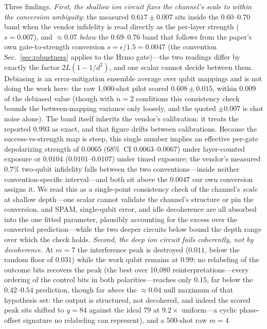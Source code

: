 \documentclass[aps,pra,reprint,superscriptaddress,nofootinbib,floatfix]{revtex4-2}
\begin{document}
Three findings. \emph{First, the shallow ion circuit fixes the
channel's scale to within the conversion ambiguity}: the measured
$0.617\pm0.007$ sits inside the $0.60$--$0.70$ band when the vendor
infidelity is read directly as the per-layer strength ($s=0.007$),
and ${\approx}0.07$ \emph{below} the $0.69$--$0.76$ band that follows
from the paper's own gate-to-strength conversion
$s=\epsilon/1.5=0.0047$ (the convention Sec.~\ref{sec:robustness}
applies to the Hrmo gate)---the two readings differ by exactly the
factor $2L(1-1/d^2)$, and one scalar cannot decide between them.
Debiasing is
an error-mitigation ensemble average over qubit mappings and is not
doing the work here: the raw 1{,}000-shot pilot scored
$0.608\pm0.015$, within $0.009$ of the debiased value (though with
$n=2$ conditions this consistency check bounds the between-mapping
variance only loosely, and the quoted $\pm0.007$ is shot noise
alone). The band itself inherits the vendor's calibration: it treats
the reported $0.993$ as exact, and that figure drifts between
calibrations.
Because the
success-vs-strength map is steep, this single number implies an
effective per-gate depolarizing strength of $0.0065$
($68\%$~CI $0.0063$--$0.0067$) under layer-counted exposure or
$0.0104$ ($0.0101$--$0.0107$) under timed exposure; the vendor's
measured $0.7\%$ two-qubit infidelity falls between the two
conventions---inside neither convention-specific interval---and both
sit above the $0.0047$ our own conversion assigns it. We read
this as a single-point consistency check of the channel's
\emph{scale} at shallow depth---one scalar cannot validate the
channel's structure or pin the conversion,
and SPAM, single-qubit error, and idle decoherence are all absorbed
into the one fitted parameter, plausibly accounting for the excess
over the converted prediction---while the two deeper circuits below
bound the depth range over which the check holds. \emph{Second, the deep ion circuit fails coherently, not by
decoherence.} At $m=7$ the interference peak is destroyed
($0.011$, below the random floor of $0.031$) while the work qubit
remains at $0.99$; no relabeling of the outcome bits recovers the
peak (the best over 10{,}080 reinterpretations---every ordering of
the control bits in both polarities---reaches only $0.15$, far below
the $0.42$--$0.54$ prediction, though far \emph{above} the
${\approx}0.04$ null maximum of that hypothesis set: the output is
structured, not decohered, and indeed the scored peak sits shifted to
$y=84$ against the ideal $79$ at $9.2\times$ uniform---a cyclic
phase-offset signature no relabeling can represent), and a 500-shot raw $m=4$
\end{document}
